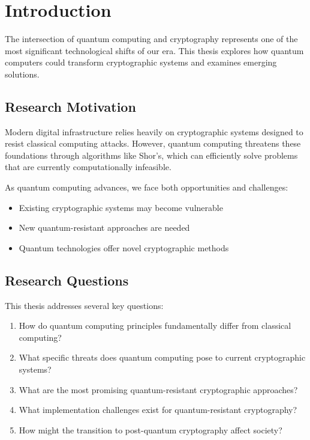 \chapter{Introduction}

The intersection of quantum computing and cryptography represents one of the most significant technological shifts of our era. This thesis explores how quantum computers could transform cryptographic systems and examines emerging solutions.

\section{Research Motivation}

Modern digital infrastructure relies heavily on cryptographic systems designed to resist classical computing attacks. However, quantum computing threatens these foundations through algorithms like Shor's, which can efficiently solve problems that are currently computationally infeasible.

As quantum computing advances, we face both opportunities and challenges:
\begin{itemize}
    \item Existing cryptographic systems may become vulnerable
    \item New quantum-resistant approaches are needed
    \item Quantum technologies offer novel cryptographic methods
\end{itemize}

\section{Research Questions}

This thesis addresses several key questions:
\begin{enumerate}
    \item How do quantum computing principles fundamentally differ from classical computing?
    \item What specific threats does quantum computing pose to current cryptographic systems?
    \item What are the most promising quantum-resistant cryptographic approaches?
    \item What implementation challenges exist for quantum-resistant cryptography?
    \item How might the transition to post-quantum cryptography affect society?
\end{enumerate}

